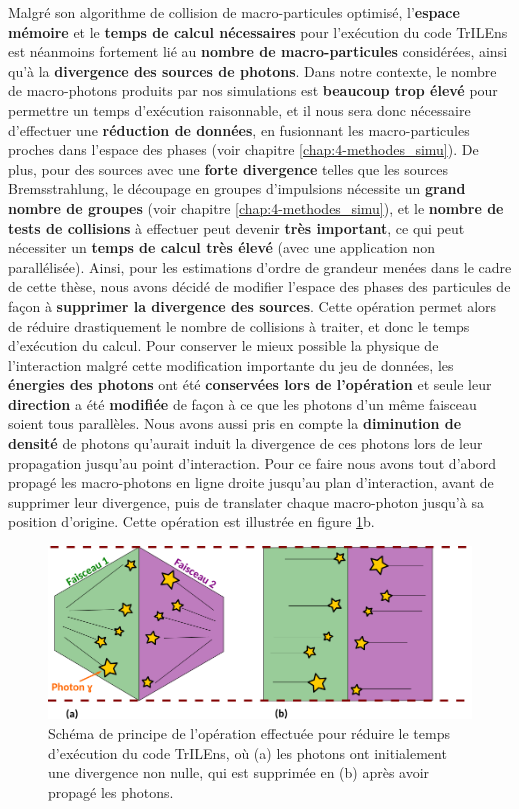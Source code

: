 \begin{refsection}
Malgré son algorithme de collision de macro-particules optimisé, l'\textbf{espace mémoire} et le \textbf{temps de calcul nécessaires} pour l'exécution du code TrILEns est néanmoins fortement lié au \textbf{nombre de macro-particules} considérées, ainsi qu'à la \textbf{divergence des sources de photons}. Dans notre contexte, le nombre de macro-photons produits par nos simulations est \textbf{beaucoup trop élevé} pour permettre un temps d'exécution raisonnable, et il nous sera donc nécessaire d'effectuer une \textbf{réduction de données}, en fusionnant les macro-particules proches dans l'espace des phases (voir chapitre \ref{chap:4-methodes_simu}). 
De plus, pour des sources avec une \textbf{forte divergence} telles que les sources Bremsstrahlung, le découpage en groupes d'impulsions nécessite un \textbf{grand nombre de groupes} (voir chapitre \ref{chap:4-methodes_simu}), et le \textbf{nombre de tests de collisions} à effectuer peut devenir \textbf{très important}, ce qui peut nécessiter un \textbf{temps de calcul très élevé} (avec une application non parallélisée).
Ainsi, pour les estimations d'ordre de grandeur menées dans le cadre de cette thèse, nous avons décidé de modifier l'espace des phases des particules de façon à \textbf{supprimer la divergence des sources}. Cette opération permet alors de réduire drastiquement le nombre de collisions à traiter, et donc le temps d'exécution du calcul. Pour conserver le mieux possible la physique de l'interaction malgré cette modification importante du jeu de données, les \textbf{énergies des photons} ont été \textbf{conservées lors de l'opération} et seule leur \textbf{direction} a été \textbf{modifiée} de façon à ce que les photons d'un même faisceau soient tous parallèles. Nous avons aussi pris en compte la \textbf{diminution de densité} de photons qu'aurait induit la divergence de ces photons lors de leur propagation jusqu'au point d'interaction. Pour ce faire nous avons tout d'abord propagé les macro-photons en ligne droite jusqu'au plan d'interaction, avant de supprimer leur divergence, puis de translater chaque macro-photon jusqu'à sa position d'origine. Cette opération est illustrée en figure \ref{fig:64-reduction_TrILEns}b.

\begin{figure}[hbtp]
	\centering
	\includegraphics[width=\linewidth]{6-opti_numerique/reduction_TrILEns.png}
	\caption{Schéma de principe de l'opération effectuée pour réduire le temps d'exécution du code TrILEns, où (a) les photons ont initialement une divergence non nulle, qui est supprimée en (b) après avoir propagé les photons.}
	\label{fig:64-reduction_TrILEns}
\end{figure}


\end{refsection}
